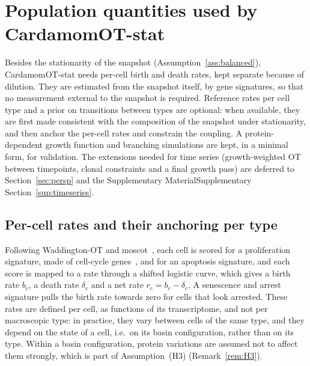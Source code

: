 \documentclass[a4paper, 11pt]{article}
\newcommand{\supref}[1]{\ifsimplified the Supplementary Material\else Supplementary Section~\ref{#1}\fi}
\theoremstyle{plain}
\theoremstyle{remark}
\begin{document}
\section{Population quantities used by CardamomOT-stat}\label{sec:popquant}

Besides the stationarity of the snapshot (Assumption~\ref{ass:balanced}), CardamomOT-stat needs per-cell birth and death rates, kept separate because of dilution. They are estimated from the snapshot itself, by gene signatures, so that no measurement external to the snapshot is required. Reference rates per cell type and a prior on transitions between types are optional: when available, they are first made consistent with the composition of the snapshot under stationarity, and then anchor the per-cell rates and constrain the coupling. A protein-dependent growth function and branching simulations are kept, in a minimal form, for validation. The extensions needed for time series (growth-weighted OT between timepoints, clonal constraints and a final growth pass) are deferred to Section~\ref{sec:persp} and \supref{sup:timeseries}.

\subsection{Per-cell rates and their anchoring per type}\label{sec:rates}

Following Waddington-OT and moscot~\cite{schiebinger2019optimal, klein2025moscot}, each cell is scored for a proliferation signature, made of cell-cycle genes~\cite{tirosh2016dissecting}, and for an apoptosis signature, and each score is mapped to a rate through a shifted logistic curve, which gives a birth rate $b_c$, a death rate $\delta_c$ and a net rate $r_c = b_c - \delta_c$. A senescence and arrest signature pulls the birth rate towards zero for cells that look arrested. These rates are defined per cell, as functions of its transcriptome, and not per macroscopic type: in practice, they vary between cells of the same type, and they depend on the state of a cell, i.e.\ on its basin configuration, rather than on its type. Within a basin configuration, protein variations are assumed not to affect them strongly, which is part of Assumption~(H3) (Remark~\ref{rem:H3}).
\end{document}
